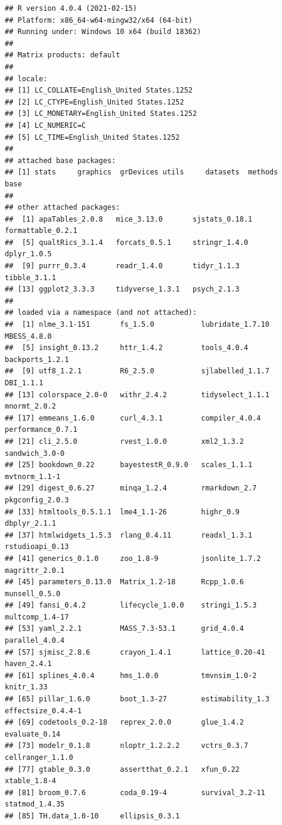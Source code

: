 \documentclass[
  english,
]{book}
\begin{document}
\begin{verbatim}
## R version 4.0.4 (2021-02-15)
## Platform: x86_64-w64-mingw32/x64 (64-bit)
## Running under: Windows 10 x64 (build 18362)
## 
## Matrix products: default
## 
## locale:
## [1] LC_COLLATE=English_United States.1252 
## [2] LC_CTYPE=English_United States.1252   
## [3] LC_MONETARY=English_United States.1252
## [4] LC_NUMERIC=C                          
## [5] LC_TIME=English_United States.1252    
## 
## attached base packages:
## [1] stats     graphics  grDevices utils     datasets  methods   base     
## 
## other attached packages:
##  [1] apaTables_2.0.8   mice_3.13.0       sjstats_0.18.1    formattable_0.2.1
##  [5] qualtRics_3.1.4   forcats_0.5.1     stringr_1.4.0     dplyr_1.0.5      
##  [9] purrr_0.3.4       readr_1.4.0       tidyr_1.1.3       tibble_3.1.1     
## [13] ggplot2_3.3.3     tidyverse_1.3.1   psych_2.1.3      
## 
## loaded via a namespace (and not attached):
##  [1] nlme_3.1-151       fs_1.5.0           lubridate_1.7.10   MBESS_4.8.0       
##  [5] insight_0.13.2     httr_1.4.2         tools_4.0.4        backports_1.2.1   
##  [9] utf8_1.2.1         R6_2.5.0           sjlabelled_1.1.7   DBI_1.1.1         
## [13] colorspace_2.0-0   withr_2.4.2        tidyselect_1.1.1   mnormt_2.0.2      
## [17] emmeans_1.6.0      curl_4.3.1         compiler_4.0.4     performance_0.7.1 
## [21] cli_2.5.0          rvest_1.0.0        xml2_1.3.2         sandwich_3.0-0    
## [25] bookdown_0.22      bayestestR_0.9.0   scales_1.1.1       mvtnorm_1.1-1     
## [29] digest_0.6.27      minqa_1.2.4        rmarkdown_2.7      pkgconfig_2.0.3   
## [33] htmltools_0.5.1.1  lme4_1.1-26        highr_0.9          dbplyr_2.1.1      
## [37] htmlwidgets_1.5.3  rlang_0.4.11       readxl_1.3.1       rstudioapi_0.13   
## [41] generics_0.1.0     zoo_1.8-9          jsonlite_1.7.2     magrittr_2.0.1    
## [45] parameters_0.13.0  Matrix_1.2-18      Rcpp_1.0.6         munsell_0.5.0     
## [49] fansi_0.4.2        lifecycle_1.0.0    stringi_1.5.3      multcomp_1.4-17   
## [53] yaml_2.2.1         MASS_7.3-53.1      grid_4.0.4         parallel_4.0.4    
## [57] sjmisc_2.8.6       crayon_1.4.1       lattice_0.20-41    haven_2.4.1       
## [61] splines_4.0.4      hms_1.0.0          tmvnsim_1.0-2      knitr_1.33        
## [65] pillar_1.6.0       boot_1.3-27        estimability_1.3   effectsize_0.4.4-1
## [69] codetools_0.2-18   reprex_2.0.0       glue_1.4.2         evaluate_0.14     
## [73] modelr_0.1.8       nloptr_1.2.2.2     vctrs_0.3.7        cellranger_1.1.0  
## [77] gtable_0.3.0       assertthat_0.2.1   xfun_0.22          xtable_1.8-4      
## [81] broom_0.7.6        coda_0.19-4        survival_3.2-11    statmod_1.4.35    
## [85] TH.data_1.0-10     ellipsis_0.3.1
\end{verbatim}
\end{document}
